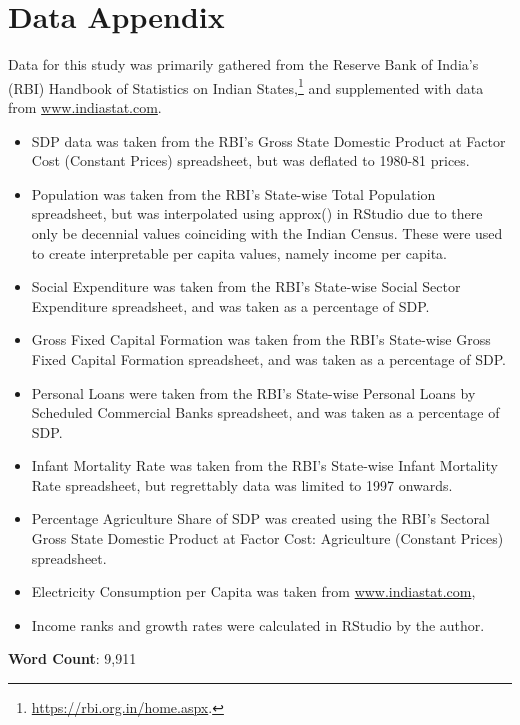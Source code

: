 \documentclass[a4paper, 11pt]{article}
\let\oldurl\url
\let\linkurl\url
\let\url\oldurl
\begin{document}
\clearpage

\nocite{*}
\section*{Data Appendix}
Data for this study was primarily gathered from the Reserve Bank of India's (RBI) Handbook of Statistics on Indian States,\footnote{\linkurl{https://rbi.org.in/home.aspx}.} and supplemented with data from \linkurl{www.indiastat.com}.  
\begin{itemize}
\item SDP data was taken from the RBI's Gross State Domestic Product at Factor Cost (Constant Prices) spreadsheet, but was deflated to 1980-81 prices.
\item Population was taken from the RBI's State-wise Total Population spreadsheet, but was interpolated using approx() in RStudio due to there only be decennial values coinciding with the Indian Census.  These were used to create interpretable per capita values, namely income per capita.
\item Social Expenditure was taken from the RBI's State-wise Social Sector Expenditure spreadsheet, and was taken as a percentage of SDP.
\item Gross Fixed Capital Formation was taken from the RBI's State-wise Gross Fixed Capital Formation spreadsheet, and was taken as a percentage of SDP.
\item Personal Loans were taken from the RBI's State-wise Personal Loans by Scheduled Commercial Banks spreadsheet, and was taken as a percentage of SDP.
\item Infant Mortality Rate was taken from the RBI's State-wise Infant Mortality Rate spreadsheet, but regrettably data was limited to 1997 onwards.
\item Percentage Agriculture Share of SDP was created using the RBI's Sectoral Gross State Domestic Product at Factor Cost: Agriculture (Constant Prices) spreadsheet.  
\item Electricity Consumption per Capita was taken from \linkurl{www.indiastat.com}, 
\item Income ranks and growth rates were calculated in RStudio by the author.
\end{itemize}

\textbf{Word Count}: 9,911
\end{document}
